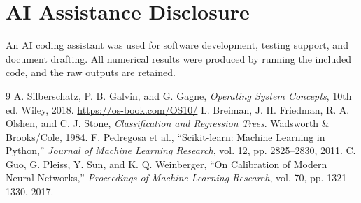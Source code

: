 \documentclass[10pt,a4paper]{article}
\begin{document}
\section*{AI Assistance Disclosure}
An AI coding assistant was used for software development, testing support, and document drafting. All numerical results were produced by running the included code, and the raw outputs are retained.
\begin{thebibliography}{9}
 A. Silberschatz, P. B. Galvin, and G. Gagne, \emph{Operating System Concepts}, 10th ed. Wiley, 2018. \url{https://os-book.com/OS10/}
 L. Breiman, J. H. Friedman, R. A. Olshen, and C. J. Stone, \emph{Classification and Regression Trees}. Wadsworth \& Brooks/Cole, 1984.
 F. Pedregosa et al., ``Scikit-learn: Machine Learning in Python,'' \emph{Journal of Machine Learning Research}, vol. 12, pp. 2825--2830, 2011.
 C. Guo, G. Pleiss, Y. Sun, and K. Q. Weinberger, ``On Calibration of Modern Neural Networks,'' \emph{Proceedings of Machine Learning Research}, vol. 70, pp. 1321--1330, 2017.
\end{thebibliography}
\end{document}
